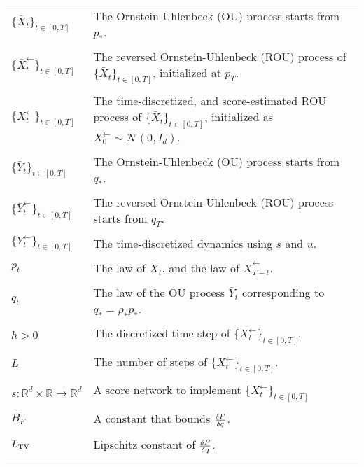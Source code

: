 \begin{longtable}{|>{\raggedright\arraybackslash}p{3cm}|>{\raggedright\arraybackslash}p{9cm}|}
$\lbrace\bar{X}_t\rbrace_{t\in[0,T]}$ & The Ornstein-Uhlenbeck (OU) process starts from $p_*$. \\ & \\ %
$\lbrace\bar{X}^\leftarrow_t\rbrace_{t\in[0,T]}$ & The reversed Ornstein-Uhlenbeck (ROU) process of $\lbrace\bar{X}_t\rbrace_{t\in[0,T]}$, initialized at $p_T$. \\ & \\ %
$\lbrace X^\leftarrow_t\rbrace_{t\in[0,T]}$ & The time-discretized, and score-estimated ROU process of $\lbrace\bar{X}_t\rbrace_{t\in[0,T]}$, initialized as $X^\leftarrow_0 \sim \mathcal{N}(0,I_d)$. \\ & \\ %
$\lbrace\bar{Y}_t\rbrace_{t\in[0,T]}$ & The Ornstein-Uhlenbeck (OU) process starts from $q_*$. \\ & \\ %
$\lbrace\bar{Y}^\leftarrow_t\rbrace_{t\in[0,T]}$ & The reversed Ornstein-Uhlenbeck (ROU) process starts from $q_T$. \\ & \\ %
$\lbrace Y^\leftarrow_t\rbrace_{t\in[0,T]}$ & The time-discretized dynamics using $s$ and $u$. \\ & \\ %

$p_t$ & The law of $\bar{X}_t$, and the law of $\bar{X}_{T-t}^\leftarrow$. \\ & \\ %
$q_t$ & The law of the OU process $\bar{Y}_t$ corresponding to $q_*=\rho_*p_*$. \\ & \\ %

$h > 0$ & The discretized time step of $\lbrace X^\leftarrow_t\rbrace_{t\in[0,T]}$. \\ & \\  %
$L$ & The number of steps of $\lbrace X^\leftarrow_t\rbrace_{t\in[0,T]}$.  \\ & \\ %

$s:\mathbb{R}^d\times\mathbb{R}\to\mathbb{R}^d$ & A score network to implement $\lbrace X^\leftarrow_t\rbrace_{t\in[0,T]}$ \\ & \\

$B_F$ & A constant that bounds $\frac{\delta F}{\delta q}$. \\ & \\

$L_{\mathrm{TV}}$ & Lipschitz constant of $\frac{\delta F}{\delta q}$. \\ & \\


\end{longtable}
